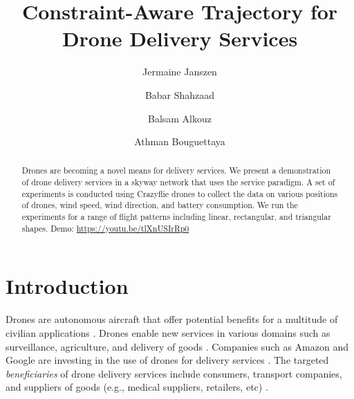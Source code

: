 \documentclass[runningheads]{llncs}
\begin{document}
%
\title{Constraint-Aware Trajectory for Drone Delivery Services\vspace{-0.4 cm}}
%
%
\author{
Jermaine Janszen \and
Babar Shahzaad \and
Balsam Alkouz \and
Athman Bouguettaya}



\maketitle              %
%
\vspace{-0.5 cm}
\begin{abstract}
Drones are becoming a novel means for delivery services. We present a demonstration of drone delivery services in a skyway network that uses the service paradigm. A set of experiments is conducted using Crazyflie drones to collect the data on various positions of drones, wind speed, wind direction, and battery consumption. We run the experiments for a range of flight patterns including linear, rectangular, and triangular shapes. Demo: \url{https://youtu.be/tlXnUSIrRp0}
\vspace{-0.2 cm}
\vspace{-0.3 cm}
\end{abstract}

\section{Introduction}
\vspace{-0.2 cm}
Drones are autonomous aircraft that offer potential benefits for a multitude of civilian applications \cite{8682048}. Drones enable new services in various domains such as surveillance, agriculture, and delivery of goods \cite{10.1145/3460418.3479289}. Companies such as Amazon and Google are investing in the use of drones for delivery services \cite{9284115}. The targeted \emph{beneficiaries} of drone delivery services include consumers, transport companies, and suppliers of goods (e.g., medical suppliers, retailers, etc) \cite{shahzaad2021robust}.
\end{document}
